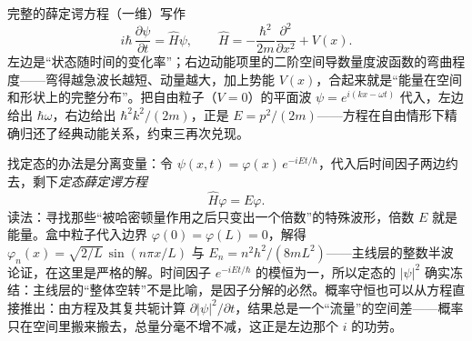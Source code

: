 \begin{center}
\end{center}

\begin{mathbridge}
完整的薛定谔方程（一维）写作
\[
  i\hbar\,\frac{\partial\psi}{\partial t}
  =\hat{H}\psi,\qquad
  \hat{H}=-\frac{\hbar^{2}}{2m}\frac{\partial^{2}}{\partial x^{2}}+V(x).
\]
左边是“状态随时间的变化率”；右边动能项里的二阶空间导数量度波函数的弯曲程度——弯得越急波长越短、动量越大，加上势能 \(V(x)\)，合起来就是“能量在空间和形状上的完整分布”。把自由粒子（\(V=0\)）的平面波 \(\psi=e^{i(kx-\omega t)}\) 代入，左边给出 \(\hbar\omega\)，右边给出 \(\hbar^{2}k^{2}/(2m)\)，正是 \(E=p^{2}/(2m)\)——方程在自由情形下精确归还了经典动能关系，约束三再次兑现。

找定态的办法是分离变量：令 \(\psi(x,t)=\varphi(x)\,e^{-iEt/\hbar}\)，代入后时间因子两边约去，剩下\emph{定态薛定谔方程}
\[
  \hat{H}\varphi=E\varphi .
\]
读法：寻找那些“被哈密顿量作用之后只变出一个倍数”的特殊波形，倍数 \(E\) 就是能量。盒中粒子代入边界 \(\varphi(0)=\varphi(L)=0\)，解得 \(\varphi_{n}(x)=\sqrt{2/L}\,\sin(n\pi x/L)\) 与 \(E_{n}=n^{2}h^{2}/(8mL^{2})\)——主线层的整数半波论证，在这里是严格的解。时间因子 \(e^{-iEt/\hbar}\) 的模恒为一，所以定态的 \(|\psi|^{2}\) 确实冻结：主线层的“整体空转”不是比喻，是因子分解的必然。概率守恒也可以从方程直接推出：由方程及其复共轭计算 \(\partial|\psi|^{2}/\partial t\)，结果总是一个“流量”的空间差——概率只在空间里搬来搬去，总量分毫不增不减，这正是左边那个 \(i\) 的功劳。
\end{mathbridge}

